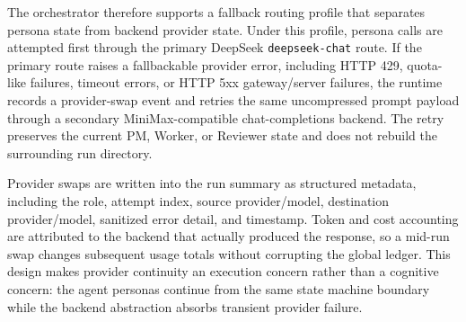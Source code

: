 The orchestrator therefore supports a fallback routing profile that separates persona state from backend provider state. Under this profile, persona calls are attempted first through the primary DeepSeek \texttt{deepseek-chat} route. If the primary route raises a fallbackable provider error, including HTTP 429, quota-like failures, timeout errors, or HTTP 5xx gateway/server failures, the runtime records a provider-swap event and retries the same uncompressed prompt payload through a secondary MiniMax-compatible chat-completions backend. The retry preserves the current PM, Worker, or Reviewer state and does not rebuild the surrounding run directory.

Provider swaps are written into the run summary as structured metadata, including the role, attempt index, source provider/model, destination provider/model, sanitized error detail, and timestamp. Token and cost accounting are attributed to the backend that actually produced the response, so a mid-run swap changes subsequent usage totals without corrupting the global  ledger. This design makes provider continuity an execution concern rather than a cognitive concern: the agent personas continue from the same state machine boundary while the backend abstraction absorbs transient provider failure.
